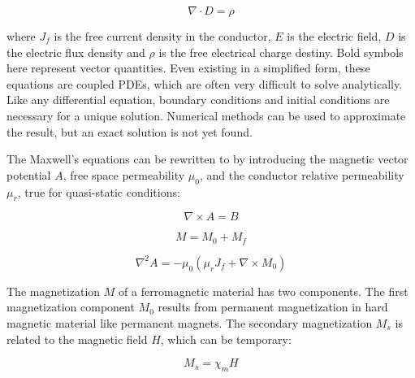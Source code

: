         \begin{equation}
            \nabla \cdot D = \rho
            \label{eq:gauss's law}
        \end{equation}
    
    
        where $J_f$ is the free current density in the conductor, $E$ is the electric field, $D$ is the electric flux density and $\rho$ is the free electrical charge destiny. Bold symbols here represent vector quantities. Even existing in a simplified form, these equations are coupled \acsp{PDE}, which are often very difficult to solve analytically. Like any differential equation, boundary conditions and initial conditions are necessary for a unique solution. Numerical methods can be used to approximate the result, but an exact solution is not yet found.
        
        
        The Maxwell's equations can be rewritten to by introducing the magnetic vector potential $A$, free space permeability ${\mu}_0$, and the conductor relative permeability ${\mu}_r$, true for quasi-static conditions:
        
        
        \begin{equation}
            \nabla \times A = B
            \label{eq:curl of A is B}
        \end{equation}        
        
        \begin{equation}
            M = M_0 + M_f
            \label{eq:component of magnetization}
        \end{equation}     
        
        \begin{equation}
            {\nabla}^2 A = -{\mu}_0 ({\mu}_r J_f + \nabla \times M_0)
            \label{eq:relation of A to Magnetization and free current}
        \end{equation}        
        
        
        The magnetization $M$ of a ferromagnetic material has two components. The first magnetization component $M_0$ results from permanent magnetization in hard magnetic material like permanent magnets. The secondary magnetization $M_s$ is related to the magnetic field $H$, which can be temporary:
        
        
        \begin{equation}
            M_s = \chi_m H
            \label{eq:secondary magnetization}
        \end{equation}     
        
